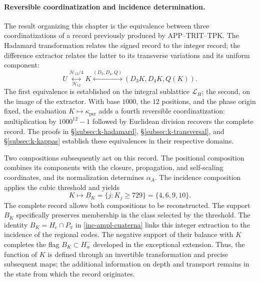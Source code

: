 \paragraph{Reversible coordinatization and incidence determination.}
\label{ampl-alfa-k-intro-reversible}
The result organizing this chapter is the equivalence between three
coordinatizations of a record previously produced by
APP--TRIT--TPK. The Hadamard transformation relates the signed record
to the integer record; the difference extractor relates
the latter to its transverse variations and its uniform component:
\[
 U\underset{\mathcal H_{12}}{\overset{\mathcal H_{12}/4}{\longleftrightarrow}}K
 \overset{(D_3,D_4,Q)}{\longleftrightarrow}
 (D_3K,D_4K,Q(K)).
\]
The first equivalence is established on the integral sublattice
$\mathcal L_H$; the second, on the image of the extractor. With
base $1000$, the $12$ positions, and the phase origin fixed, the evaluation
$K\mapsto\kappa_{\mathrm{per}}$ adds a fourth reversible
coordinatization: multiplication by $1000^{12}-1$ followed by Euclidean
division recovers the complete record. The proofs in
\S\ref{subsec:k-hadamard}, \S\ref{subsec:k-transversal}, and
\S\ref{subsec:k-kappas} establish these equivalences in their respective
domains.

Two compositions subsequently act on this record. The positional
composition combines its components with the closure, propagation,
and self-scaling coordinates, and its normalization determines $\alpha_A$.
The incidence composition applies the cubic threshold and yields
\[
 K\longmapsto B_K=\{j:K_j\geq729\}=\{4,6,9,10\}.
\]
The complete record allows both compositions to be reconstructed. The support
$B_K$ specifically preserves membership in the class selected
by the threshold. The identity $B_K=H_e\cap P_\pi$ in
\eqref{inc-ampl-cuaterna} links this integer extraction to the incidence
of the regional codes. The negative support of their balance with $K$
completes the flag $B_K\subset H^-_\alpha$ developed in the
exceptional extension. Thus, the function of $K$ is defined through
an invertible transformation and precise subsequent maps;
the additional information on depth and transport remains
in the state from which the record originates.


